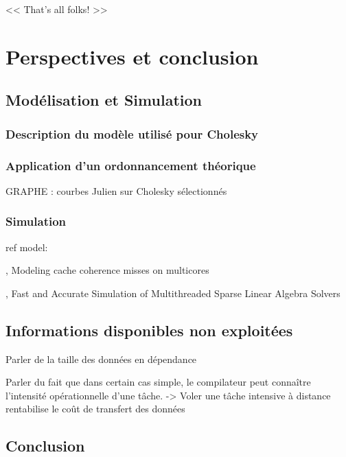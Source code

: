 \begin{savequote}[6cm]
<< That's all folks! >>
\end{savequote}

\chapter{Perspectives et conclusion}\label{chap:conclusion}
\chaptertoc

\section{Modélisation et Simulation}

\subsection{Description du modèle utilisé pour Cholesky}

\subsection{Application d'un ordonnancement théorique}

\begin{todo}
GRAPHE : courbes Julien sur Cholesky sélectionnés
\end{todo}

\subsection{Simulation}

ref model:

\cite{Pan2014}, Modeling cache coherence misses on multicores

\cite{Stanisic2016}, Fast and Accurate Simulation of Multithreaded Sparse Linear Algebra Solvers





\section{Informations disponibles non exploitées}


Parler de la taille des données en dépendance

Parler du fait que dans certain cas simple, le compilateur peut connaître l'intensité opérationnelle d'une tâche.
-> Voler une tâche intensive à distance rentabilise le coût de transfert des données

%


\section{Conclusion}
